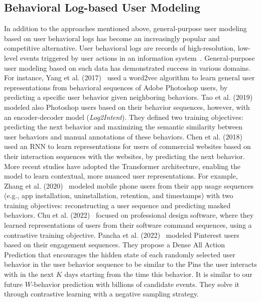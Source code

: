 \documentclass{article}
\begin{document}
\subsection{Behavioral Log-based User Modeling}
In addition to the approaches mentioned above, general-purpose user modeling based on user behavioral logs has become an increasingly popular and competitive alternative.
User behavioral logs are records of high-resolution, low-level events triggered by user actions in an information system~\citep{abb_reference_2022}.
General-purpose user modeling based on such data has demonstrated success in various domains.
For instance, Yang et al. (2017)~\citep{yang_personalizing_2017} used a word2vec algorithm to learn general user representations from behavioral sequences of Adobe Photoshop users, by predicting a specific user behavior given neighboring behaviors. 
Tao et al. (2019)~\citep{tao_log2intent_2019} modeled also Photoshop users based on their behavior sequences, however, with an encoder-decoder model (\textit{Log2Intent}). They defined two training objectives: predicting the next behavior and maximizing the semantic similarity between user behaviors and manual annotations of these behaviors. 
Chen et al. (2018)~\citep{chen_predictive_2018} used an RNN to learn representations for users of commercial websites based on their interaction sequences with the websites, by predicting the next behavior. 
More recent studies have adopted the Transformer architecture, enabling the model to learn contextual, more nuanced user representations.
For example, Zhang et al. (2020)~\citep{zhang_general-purpose_2020} modeled mobile phone users from their app usage sequences (e.g., app installation, uninstallation, retention, and timestamps) with two training objectives: reconstructing a user sequence and predicting masked behaviors. Chu et al. (2022)~\citep{chu_simcurl_2022} focused on professional design software, where they learned representations of users from their software command sequences, using a contrastive training objective. 
Pancha et al. (2022)~\citep{pancha_pinnerformer_2022} modeled Pinterest users based on their engagement sequences.
They propose a Dense All Action Prediction that encourages the hidden state of each randomly selected user behavior in the user behavior sequence to be similar to the Pins the user interacts with in the next $K$ days starting from the time this behavior. It is similar to our future $W$-behavior prediction with billions of candidate events. They solve it through contrastive learning with a negative sampling strategy.
\end{document}
